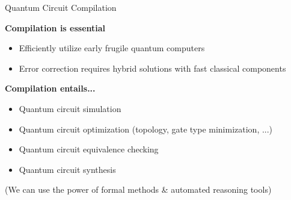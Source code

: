 \begin{refsection}
\begin{frame}{Quantum Circuit Compilation}


	\begin{block}{\bf Compilation is essential}
		\begin{itemize}
		\item Efficiently utilize early frugile quantum computers
		\item Error correction requires hybrid solutions with fast classical components
		\end{itemize}
	\end{block}

\pause
\vspace{-.5em}

	\begin{block}{\bf Compilation entails...}
		\begin{itemize}
		\item {Quantum circuit simulation}~\cite{burgholzer2020advanced,viamontes2003improving,vinkhuijzen2021limdd}
		\item Quantum circuit optimization (topology, gate type minimization, ...)~\cite{shaik2023optimal}
		\item Quantum circuit equivalence checking~\cite{thanos2023fast,peham2022equivalence}
		\item Quantum circuit synthesis~\cite{brand2023quantum,}
		\end{itemize}
	\end{block}

\vspace{-.8em}

\printbibliography[section=\therefsection]

\pause
\centering
\alert{(We can use the power of formal methods \& automated reasoning tools)}


\end{frame}
\end{refsection}





